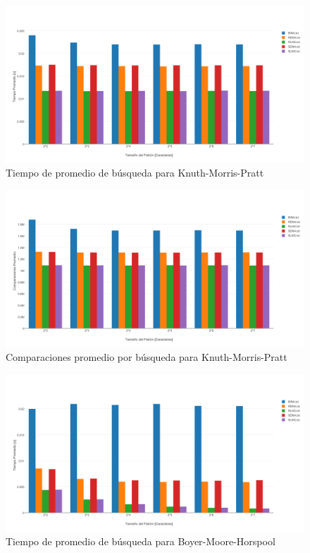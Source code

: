 \documentclass[14pt,letterpaper,hidelinks]{extarticle}
\begin{document}
		\begin{figure}[ht!]
			\centering
			\includegraphics[scale=0.5]{img/tKMP.pdf}
			\caption{Tiempo de promedio de búsqueda para Knuth-Morris-Pratt} \label{construccion}
		\end{figure}

	\newpage
		\begin{figure}[ht!]
			\centering
			\includegraphics[scale=0.5]{img/cKMP.pdf}
			\caption{Comparaciones promedio por búsqueda para Knuth-Morris-Pratt} \label{construccion}
		\end{figure}


		\begin{figure}[ht!]
			\centering
			\includegraphics[scale=0.5]{img/tBMH.pdf}
			\caption{Tiempo de promedio de búsqueda para Boyer-Moore-Horspool} \label{construccion}
		\end{figure}
\end{document}
